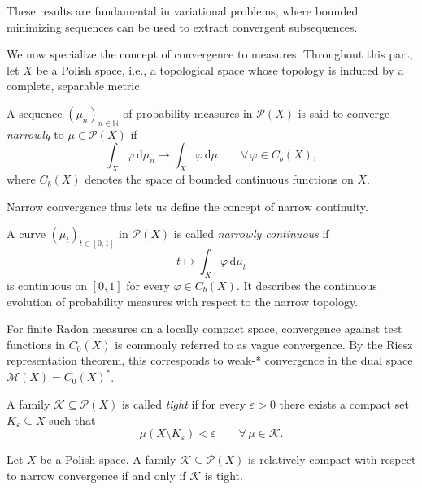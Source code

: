These results are fundamental in variational
problems, where bounded minimizing sequences
can be used to extract convergent subsequences.

We now specialize the concept of convergence
to measures. Throughout this part, let $X$
be a Polish space, i.e., a topological space
whose topology is induced by a complete,
separable metric.

\begin{definition}
    A sequence $(\mu_n)_{n\in\mathbb{N}}$
    of probability measures in $\mathcal{P}(X)$
    is said to converge \emph{narrowly} to
    $\mu\in\mathcal{P}(X)$ if
    \[
        \int_X\varphi\,\mathrm{d}\mu_n
        \longrightarrow
        \int_X\varphi\,\mathrm{d}\mu
        \qquad
        \forall\,\varphi\in C_b(X),
    \]
    where $C_b(X)$ denotes the space of
    bounded continuous functions on $X$.
\end{definition}
Narrow convergence thus lets us define the concept of narrow continuity.
\begin{definition}
	A curve $(\mu_t)_{t\in[0,1]}$ in $\mathscr{P}(X)$ is called \emph{narrowly continuous} if 
	$$
	t\mapsto\int_X\varphi\,\mathrm d\mu_t
	$$
	is continuous on $[0,1]$ for every $\varphi\in C_b(X)$. It describes the continuous evolution of probability measures with respect to the narrow topology.
\end{definition}

For finite Radon measures on a locally compact
space, convergence against test functions
in $C_0(X)$ is commonly referred
to as vague convergence. By the Riesz
representation theorem, this corresponds to
weak-* convergence in the dual space
$\mathcal{M}(X)=C_0(X)^*$.

\begin{definition}[Tightness]
    A family $\mathcal{K}\subseteq\mathcal{P}(X)$
    is called \emph{tight} if for every
    $\varepsilon>0$ there exists a compact
    set $K_\varepsilon\subseteq X$ such that
    \[
        \mu(X\setminus K_\varepsilon)
        <\varepsilon
        \qquad
        \forall\,\mu\in\mathcal{K}.
    \]
\end{definition}

\begin{theorem}
    Let $X$ be a Polish space. A family
    $\mathcal{K}\subseteq\mathcal{P}(X)$
    is relatively compact with respect to
    narrow convergence if and only if
    $\mathcal{K}$ is tight.
\end{theorem}

